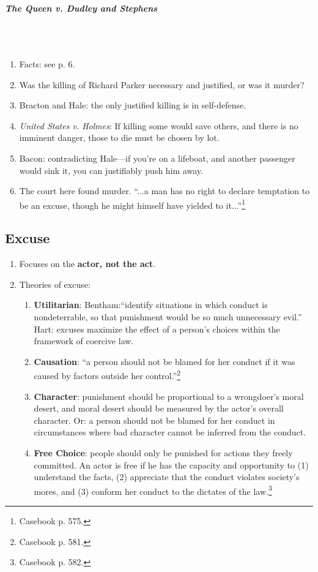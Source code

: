 \paragraph{\emph{The Queen v. Dudley and Stephens}}
~\\\\
\begin{enumerate}
    \item Facts: see p. 6.
    \item Was the killing of Richard Parker necessary and justified, or was it 
    murder?
    \item Bracton and Hale: the only justified killing is in self-defense.
    \item \emph{United States v. Holmes}: If killing some would save others, 
    and there is no imminent danger, those to die must be chosen by lot.
    \item Bacon: contradicting Hale---if you're on a lifeboat, and another 
    passenger would sink it, you can justifiably push him away.
    \item The court here found murder. ``...a man has no right to declare 
    temptation to be an excuse, though he might himself have yielded to 
    it...''\footnote{Casebook p. 575.}
\end{enumerate}

\subsection{Excuse}

\begin{enumerate}
    \item Focuses on the \textbf{actor, not the act}.
    \item Theories of excuse:
    \begin{enumerate}
        \item \textbf{Utilitarian}: Bentham:``identify situations in which 
        conduct is nondeterrable, so that punishment would be so much 
        unnecessary evil.'' Hart: excuses maximize the effect of a person's 
        choices within the framework of coercive law.
        \item \textbf{Causation}: ``a person should not be blamed for her 
        conduct if it was caused by factors outside her 
        control.''\footnote{Casebook p. 581.}
        \item \textbf{Character}: punishment should be proportional to a 
        wrongdoer's moral desert, and moral desert should be measured by the 
        actor's overall character. Or: a person should not be blamed for her 
        conduct in circumstances where bad character cannot be inferred from 
        the conduct.
        \item \textbf{Free Choice}: people should only be punished for actions 
        they freely committed. An actor is free if he has the capacity and 
        opportunity to (1) understand the facts, (2) appreciate that the 
        conduct violates society's mores, and (3) conform her conduct to the 
        dictates of the law.\footnote{Casebook p. 582.}
    \end{enumerate}
\end{enumerate}

